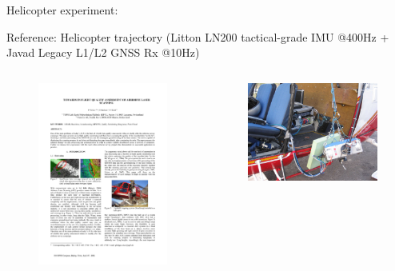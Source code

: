 \documentclass[envcountsect,usenames,dvipsnames]{beamer}
\theoremstyle{mystyle}
\begin{document}
\begin{frame}{Helicopter experiment:}
	\begin{exampleblock}{Reference: }
		Helicopter trajectory (Litton LN200 tactical-grade IMU @400Hz + Javad Legacy L1/L2 GNSS Rx @10Hz)
	\end{exampleblock}
 \begin{columns}
   \begin{column}{.5\linewidth}
	\begin{figure}
	    \centering
	  \includegraphics[width = 5.5cm]{Images/Scan2Map}
	\end{figure}
   \end{column}
   \begin{column}{.5\linewidth}
	\begin{figure}
	    \centering
	  \includegraphics[width = 5.55cm]{Images/cube3.jpg}
	\end{figure}
   \end{column}
 \end{columns}		

\end{frame}
\end{document}
